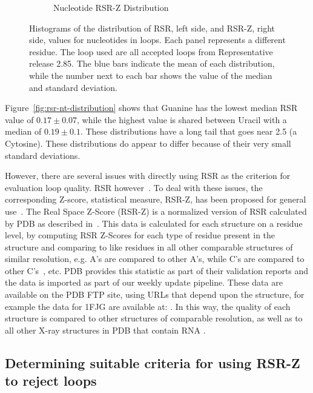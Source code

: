 \begin{figure}[ht]
\begin{subfigure}[b]{0.49\textwidth}
    \caption{Nucleotide RSR-Z Distribution}
\label{fig:rsrz-nt-distribution}
  \end{subfigure}
  \caption{Histograms of the distribution of RSR, left side, and RSR-Z, right
  side, values for nucleotides in loops. Each panel represents a different
  residue. The loop used are all accepted loops from Representative release
  2.85. The blue bars indicate the mean of each distribution, while the number
  next to each bar shows the value of the median and standard deviation.}
\label{fig:nt-quality-distribution}
\end{figure}

Figure~\ref{fig:rsr-nt-distribution} shows that Guanine has the lowest median
RSR value of $0.17 \pm 0.07$, while the highest value is shared between Uracil
with a median of $0.19 \pm 0.1$. These distributions have a long tail that goes
near 2.5 (a Cytosine). These distributions do appear to differ because of their
very small standard deviations.

However, there are several issues with directly using RSR as the criterion for
evaluation loop quality. RSR however~\cite{Tickle2012}. To deal with these
issues, the corresponding Z-score, statistical measure, RSR-Z, has been proposed
for general use~\cite{Gore2012}. The Real Space Z-Score (RSR-Z) is a normalized
version of RSR calculated by PDB as described in~\cite{Gore2012}. This data is
calculated for each structure on a residue level, by computing RSR Z-Scores for
each type of residue present in the structure and comparing to like residues in
all other comparable structures of similar resolution, e.g. A's are compared to
other A's, while C's are compared to other C's~\cite{Gore2012, Kleywegt2004a},
etc. PDB provides this statistic as part of their validation reports and the
data is imported as part of our weekly update pipeline. These data are available
on the PDB FTP site, using URLs that depend upon the structure, for example the
data for 1FJG are available at:
. In this way,
the quality of each structure is compared to other structures of comparable
resolution, as well as to all other X-ray structures in PDB that contain RNA
\cite{Gore2012}.

\subsection{Determining suitable criteria for using RSR-Z to reject loops}

